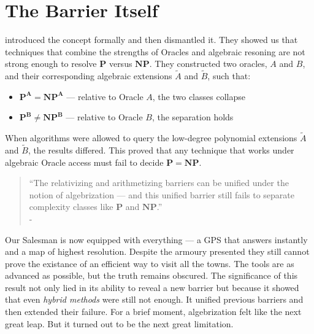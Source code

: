 \documentclass[12pt]{report}
\begin{document}
\section{The Barrier Itself}
\cite{arora2008algebrization} introduced the concept formally and then dismantled it.
They showed us that techniques that combine the strengths of Oracles and algebraic resoning are not strong enough to resolve $\mathbf{P}$ versus $\mathbf{NP}$.  
They constructed two oracles, $A$ and $B$, and their corresponding algebraic extensions $\tilde{A}$ and $\tilde{B}$, such that:
\begin{itemize}
    \item $\mathbf{P^A = NP^A}$ --- relative to Oracle $A$, the two classes collapse
    \item $\mathbf{P^B \ne NP^B}$ --- relative to Oracle $B$, the separation holds
\end{itemize}
When algorithms were allowed to query the low-degree polynomial extensions $\tilde{A}$ and $\tilde{B}$, the results differed.
This proved that any technique that works under algebraic Oracle access must fail to decide $\mathbf{P = NP}$.
\begin{quote}
    “The relativizing and arithmetizing barriers can be unified under the notion of algebrization --- and this unified barrier still fails to separate complexity classes like $\mathbf{P}$ and $\mathbf{NP}$.”\\
    - \cite{arora2008algebrization}
\end{quote}

Our Salesman is now equipped with everything --- a GPS that answers instantly and a map of highest resolution.
Despite the armoury presented they still cannot prove the existance of an efficient way to visit all the towns.
The tools are as advanced as possible, but the truth remains obscured.
The significance of this result not only lied in its ability to reveal a new barrier but because it showed that even \textit{hybrid methods} were still not enough.
It unified previous barriers and then extended their failure.
For a brief moment, algebrization felt like the next great leap.
But it turned out to be the next great limitation.
\end{document}
